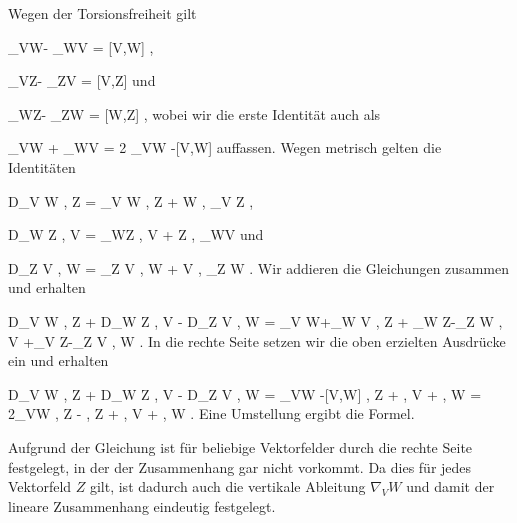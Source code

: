 {

Wegen der Torsionsfreiheit gilt

\mavergleichskettedisp
{\vergleichskette
{ \nabla_VW- \nabla_WV
}
{ =} { [V,W]
}
{ } {
}
{ } {
}
{ } {
}
}
{}{}{,}

\mavergleichskettedisp
{\vergleichskette
{ \nabla_VZ- \nabla_ZV
}
{ =} { [V,Z]
}
{ } {
}
{ } {
}
{ } {
}
}
{}{}{}
und

\mavergleichskettedisp
{\vergleichskette
{ \nabla_WZ- \nabla_ZW
}
{ =} { [W,Z]
}
{ } {
}
{ } {
}
{ } {
}
}
{}{}{,}
wobei wir die erste Identität auch als

\mavergleichskettedisp
{\vergleichskette
{ \nabla_VW + \nabla_WV
}
{ =} { 2 \nabla_VW -[V,W]
}
{ } {
}
{ } {
}
{ } {
}
}
{}{}{}
auffassen. Wegen metrisch gelten die Identitäten

\mavergleichskettedisp
{\vergleichskette
{ D_V \left\langle  W  ,  Z  \right\rangle
}
{ =} { \left\langle \nabla_V W , Z  \right\rangle  + \left\langle  W  ,  \nabla_V Z  \right\rangle
}
{ } {
}
{ } {
}
{ } {
}
}
{}{}{,}

\mavergleichskettedisp
{\vergleichskette
{ D_W \left\langle  Z  ,  V  \right\rangle
}
{ =} { \left\langle \nabla_WZ , V  \right\rangle  + \left\langle  Z  ,  \nabla_WV  \right\rangle
}
{ } {
}
{ } {
}
{ } {
}
}
{}{}{}
und

\mavergleichskettedisp
{\vergleichskette
{ D_Z \left\langle  V  ,  W  \right\rangle
}
{ =} { \left\langle \nabla_Z V , W  \right\rangle  + \left\langle  V  ,  \nabla_Z W   \right\rangle
}
{ } {
}
{ } {
}
{ } {
}
}
{}{}{.}
Wir addieren die Gleichungen zusammen und erhalten

\mavergleichskettedisphandlinks
{\vergleichskettedisphandlinks
{ D_V \left\langle  W  ,  Z  \right\rangle+ D_W \left\langle  Z  ,  V  \right\rangle  - D_Z \left\langle  V  ,  W  \right\rangle
}
{ =} { \left\langle \nabla_V W+\nabla_W V  ,  Z  \right\rangle + \left\langle \nabla_W Z-\nabla_Z W   ,  V  \right\rangle+\left\langle  \nabla_V Z-\nabla_Z V   ,  W  \right\rangle
}
{ } {
}
{ } {
}
{ } {
}
}
{}{}{.}
In die rechte Seite setzen wir die oben erzielten Ausdrücke ein und erhalten

\mavergleichskettealignhandlinks
{\vergleichskettealignhandlinks
{ D_V \left\langle  W  ,  Z  \right\rangle+ D_W \left\langle  Z  ,  V  \right\rangle  - D_Z \left\langle  V  ,  W  \right\rangle
}
{ =} { \left{} \nabla_VW -[V,W]  ,  Z  \right\rangle + \left\langle  [W,Z]  ,  V  \right\rangle + \left\langle [V,Z]   ,  W  \right\rangle
}
{ =} { 2\left\langle  \nabla_VW   ,  Z  \right\rangle - \left\langle  [V,W]  ,  Z  \right\rangle + \left\langle  [W,Z]  ,  V  \right\rangle + \left\langle  [V,Z]   ,  W  \right\rangle
}
{ } {
}
{ } {
}
}
{}
{}{.}
Eine Umstellung ergibt die Formel.

Aufgrund der Gleichung ist
 für beliebige Vektorfelder durch die rechte Seite festgelegt, in der der Zusammenhang gar nicht vorkommt. Da dies für jedes Vektorfeld $Z$ gilt, ist dadurch auch die vertikale Ableitung $\nabla_V W$ und damit der lineare Zusammenhang eindeutig festgelegt.

}

